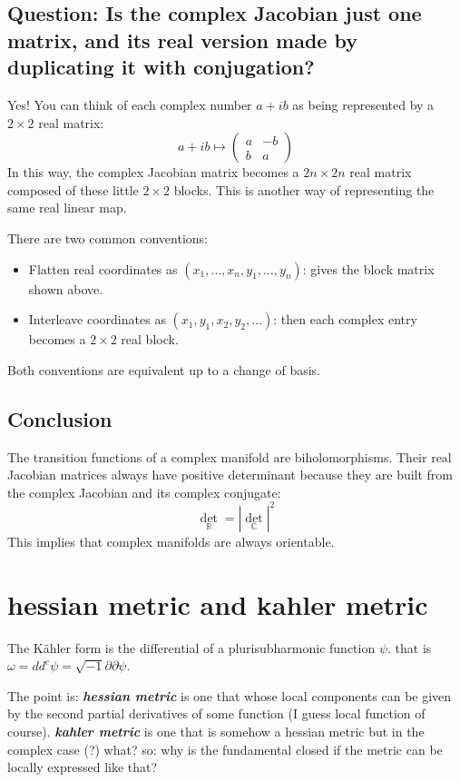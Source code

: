\subsection*{Question: Is the complex Jacobian just one matrix, and its real version made by duplicating it with conjugation?}

Yes! You can think of each complex number \( a + ib \) as being represented by a \(2 \times 2\) real matrix:
\[
a + ib \mapsto \begin{pmatrix}
a & -b \\
b & a
\end{pmatrix}
\]
In this way, the complex Jacobian matrix becomes a \(2n \times 2n\) real matrix composed of these little \(2 \times 2\) blocks. This is another way of representing the same real linear map.

There are two common conventions:
\begin{itemize}
    \item Flatten real coordinates as \( (x_1, \dots, x_n, y_1, \dots, y_n) \): gives the block matrix shown above.
    \item Interleave coordinates as \( (x_1, y_1, x_2, y_2, \dots) \): then each complex entry becomes a \(2 \times 2\) real block.
\end{itemize}

Both conventions are equivalent up to a change of basis.

\subsection*{Conclusion}

The transition functions of a complex manifold are biholomorphisms. Their real Jacobian matrices always have positive determinant because they are built from the complex Jacobian and its complex conjugate:
\[
\det_{\mathbb{R}} = |\det_{\mathbb{C}}|^2
\]
This implies that complex manifolds are always orientable.

\section{hessian metric and kahler metric}

The Kähler form is the differential of a plurisubharmonic function \(\psi\). that is \(\omega=d d^c \psi=\sqrt{-1} \partial \partial \psi\).

The point is: \textit{\textbf{hessian metric}} is one that whose local components can be given by the second partial derivatives of some function (I guess local function of course). \textit{\textbf{kahler metric}} is one that is somehow a hessian metric but in the complex case (?) what? so: why is the fundamental closed if the metric can be locally expressed like that?

